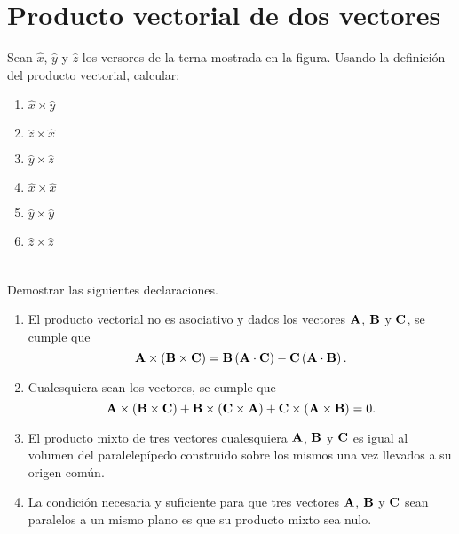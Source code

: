 \documentclass[a4paper, 12pt, fleqn]{article}
\begin{document}
\section{Producto vectorial de dos vectores}

Sean $\hat{x}$, $\hat{y}$ y $\hat{z}$ los versores de la terna mostrada en la figura. Usando la definición del producto vectorial, calcular:
    \begin{enumerate}[label=(\alph*)]
        \item $\hat{x} \times \hat{y}$
        \item $\hat{z} \times \hat{x}$
        \item $\hat{y} \times \hat{z}$
        \item $\hat{x} \times \hat{x}$
        \item $\hat{y} \times \hat{y}$
        \item $\hat{z} \times \hat{z}$
    \end{enumerate}

\begin{center}
\end{center}
    
\section{}

Demostrar las siguientes declaraciones.
    \begin{enumerate}[label=(\alph*)]
        \item El producto vectorial no es asociativo y dados los vectores ${\bf A}$, ${\bf B}$ y ${\bf C}$, se cumple que $$ {\bf A} \times \left( {\bf B} \times {\bf C} \right) = {\bf B} \left( {\bf A} \cdot {\bf C} \right) - {\bf C} \left( {\bf A} \cdot {\bf B} \right). $$
        \item Cualesquiera sean los vectores, se cumple que $$ {\bf A} \times \left( {\bf B} \times {\bf C} \right) + {\bf B} \times \left( {\bf C} \times {\bf A} \right) + {\bf C} \times \left( {\bf A} \times {\bf B} \right) = 0. $$
        \item El producto mixto de tres vectores cualesquiera ${\bf A}$, ${\bf B}$ y ${\bf C}$ es igual al volumen del paralelepípedo construido sobre los mismos una vez llevados a su origen común.
        \item La condición necesaria y suficiente para que tres vectores ${\bf A}$, ${\bf B}$ y ${\bf C}$ sean paralelos a un mismo plano es que su producto mixto sea nulo.
    \end{enumerate}
    
\end{document}
